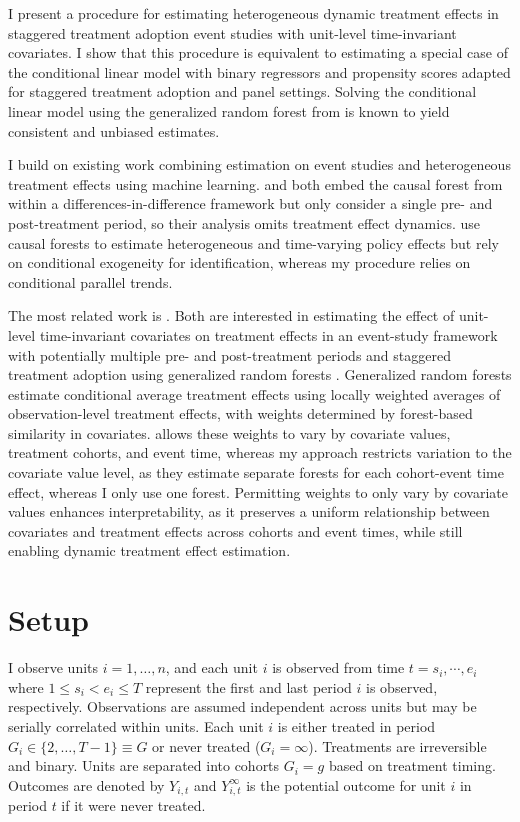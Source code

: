 \documentclass[12pt,notitlepage]{article}
\begin{document}
I present a procedure for estimating heterogeneous dynamic treatment effects in staggered treatment adoption event studies with unit-level time-invariant covariates.
I show that this procedure is equivalent to estimating a special case of the conditional linear model with binary regressors and propensity scores adapted for staggered treatment adoption and panel settings. 
Solving the conditional linear model using the generalized random forest from \cite{athey_generalized_2019} is known to yield consistent and unbiased estimates.

I build on existing work combining estimation on event studies and heterogeneous treatment effects using machine learning.
\cite{wang_effect_2022} and \cite{miao_eects_2023}  both embed the causal forest from \cite{athey_generalized_2019} within a differences-in-difference framework but only consider a single pre- and post-treatment period, so their analysis omits treatment effect dynamics. 
\cite{miller2020causal} use causal forests to estimate heterogeneous and time-varying policy effects but rely on conditional exogeneity for identification, whereas my procedure relies on conditional parallel trends. 


The most related work is \cite{gavrilova_difference--difference_2025}.
Both are interested in estimating the effect of unit-level time-invariant covariates on treatment effects in an event-study framework with potentially multiple pre- and post-treatment periods and staggered treatment adoption using generalized random forests \citep{athey_generalized_2019}. 
Generalized random forests estimate conditional average treatment effects using locally weighted averages of observation-level treatment effects, with weights determined by forest-based similarity in covariates.
\cite{gavrilova_difference--difference_2025} allows these weights to vary by covariate values, treatment cohorts, and event time, whereas my approach restricts variation to the covariate value level, as they estimate separate forests for each cohort-event time effect, whereas I only use one forest. 
Permitting weights to only vary by covariate values enhances interpretability, as it preserves a uniform relationship between covariates and treatment effects across cohorts and event times, while still enabling dynamic treatment effect estimation.

\section{Setup}
I observe units $i=1,\dots,n$, and each unit $i$ is observed from time $t=s_i, \cdots, e_i$ where $1 \leq s_i <e_i\leq T$ represent the first and last period $i$ is observed, respectively.  
Observations are assumed independent across units but may be serially correlated within units.
Each unit $i$ is either treated in period $G_i \in \{2, \dots, T-1\} \equiv G$ or never treated ($G_i=\infty$). 
Treatments are irreversible and binary. 
Units are separated into cohorts $G_i = g$ based on treatment timing. 
Outcomes are denoted by $Y_{i,t}$ and $Y_{i,t}^\infty$ is the potential outcome for unit $i$ in period $t$ if it were never treated.
\end{document}
